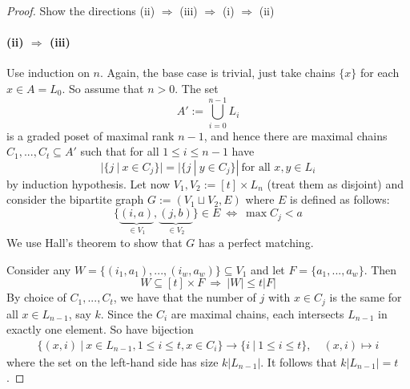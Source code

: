 \documentclass{scrartcl}
\theoremstyle{definition}
\begin{document}
\begin{proof}
    Show the directions (ii) $\Rightarrow$ (iii) $\Rightarrow$ (i) $\Rightarrow$ (ii)
    \paragraph{(ii) $\Rightarrow$ (iii)} Use induction on $n$.
    Again, the base case is trivial, just take chains $\{x\}$ for each $x \in A = L_0$.
    So assume that $n > 0$. The set
    \begin{equation*}
        A' := \bigcup_{i = 0}^{n - 1} L_i
    \end{equation*}
    is a graded poset of maximal rank $n - 1$, and hence there are maximal chains $C_1, ..., C_t \subseteq A'$ such that for all $1 \leq i \leq n - 1$ have
    \begin{equation*}
        |\{j \ | \ x \in C_j\}| = |\{j \ | \ y \in C_j\}| \ \text{for all $x, y \in L_i$}
    \end{equation*}
    by induction hypothesis.
    Let now $V_1, V_2 := [t] \times L_n$ (treat them as disjoint) and consider the bipartite graph $G := (V_1 \sqcup V_2, E)$ where $E$ is defined as follows:
    \begin{equation*}
        \{ \underbrace{(i, a)}_{\in V_1}, \underbrace{(j, b)}_{\in V_2} \} \in E \ \Leftrightarrow \ \max C_j < a
    \end{equation*}
    We use Hall's theorem to show that $G$ has a perfect matching.

    Consider any $W = \{ (i_1, a_1), ..., (i_w, a_w) \} \subseteq V_1$ and let $F = \{ a_1, ..., a_w \}$.
    Then
    \begin{equation*}
        W \subseteq [t] \times F \ \Rightarrow \ |W| \leq t|F|
    \end{equation*}
    By choice of $C_1, ..., C_t$, we have that the number of $j$ with $x \in C_j$ is the same for all $x \in L_{n - 1}$, say $k$.
    Since the $C_i$ are maximal chains, each intersects $L_{n - 1}$ in exactly one element.
    So have bijection
    \begin{align*}
        \{ (x, i) \ | \ x \in L_{n - 1}, 1 \leq i \leq t, x \in C_i\} \to \{ i \ | \ 1 \leq i \leq t \}, \quad (x, i) \mapsto i
    \end{align*}
    where the set on the left-hand side has size $k |L_{n - 1}|$. It follows that $k|L_{n - 1}| = t$.


\end{proof}
\end{document}
